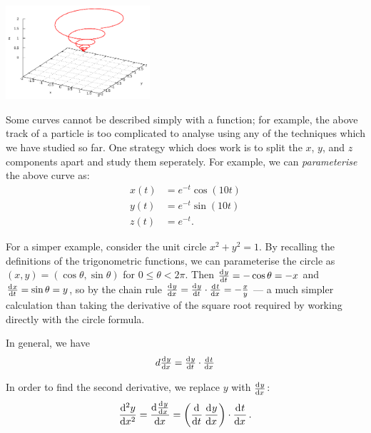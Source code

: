 


\begin{center}
  \includegraphics[width=0.4\textwidth]{space-curve-4}
\end{center}
Some curves cannot be described simply with a function; for example, the above track of a particle is
too complicated to analyse using any of the techniques which we have studied so far. One strategy which
does work is to split the $ x $, $ y $, and $ z $ components apart and study them seperately. For
example, we can \textit{parameterise} the above curve as:
\begin{align*}
  x(t) &= e^{-t} \cos(10t)\\
  y(t) &= e^{-t} \sin(10t)\\
  z(t) &= e^{-t}.
\end{align*}

For a simper example, consider the unit circle $ x^2 + y^2 = 1 $. By recalling the definitions
of the trigonometric functions, we can parameterise the circle as $ (x, y) = (\cos \theta, \sin \theta) $
for $ 0 \leq \theta < 2\pi $. Then $ \od{y}{t} = -\cos \theta = -x $ and $ \od{x}{t} = \sin \theta = y $,
so by the chain rule $ \od{y}{x} = \od{y}{t} \cdot \od{t}{x} = -\frac{x}{y} $ --- a much simpler calculation
than taking the derivative of the square root required by working directly with the circle formula.

In general, we have
\begin{displaymath}d
  \od{y}{x} = \od{y}{t} \cdot \od{t}{x}
\end{displaymath}

In order to find the second derivative, we replace $ y $ with $ \od{y}{x} $:
\begin{displaymath}
  \dod[2]{y}{x} = \dod{\od{y}{x}}{x} = \left(\dod{}{t} \dod{y}{x}\right) \cdot \dod{t}{x}.
\end{displaymath}

\clearpage
